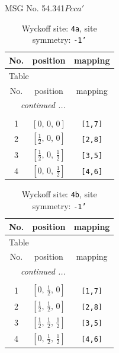 \documentclass[fleqn,8pt]{jsarticle}
\begin{document}
\setcounter{MaxMatrixCols}{32}

\renewcommand{\tablename}{Table~}
\renewcommand{\figurename}{Figure~}
\begin{center}
\LARGE
MSG No. 54.341\quad$Pcca'$
\end{center}
\renewcommand{\arraystretch}{1.2}
\begin{longtable}{ccc}
\caption{Wyckoff site: {\tt 4a}, site symmetry: {\tt -1'}}
 \\
 \hline \hline
No. & position & mapping \\ \hline \endfirsthead

\multicolumn{2}{l}{\tablename\ \thetable{}} \\
 \hline \hline
No. & position & mapping \\ \hline \endhead

 \hline \hline
\multicolumn{2}{r}{\footnotesize\it continued ...} \\ \endfoot

 \hline \hline
\multicolumn{2}{r}{} \\ \endlastfoot

1 & $\left[ 0,\, 0,\, 0 \right]$ & {\tt [1,7]} \\ \hline
2 & $\left[ \frac{1}{2},\, 0,\, 0 \right]$ & {\tt [2,8]} \\ \hline
3 & $\left[ \frac{1}{2},\, 0,\, \frac{1}{2} \right]$ & {\tt [3,5]} \\ \hline
4 & $\left[ 0,\, 0,\, \frac{1}{2} \right]$ & {\tt [4,6]} \\
\end{longtable}
\renewcommand{\arraystretch}{1.2}
\begin{longtable}{ccc}
\caption{Wyckoff site: {\tt 4b}, site symmetry: {\tt -1'}}
 \\
 \hline \hline
No. & position & mapping \\ \hline \endfirsthead

\multicolumn{2}{l}{\tablename\ \thetable{}} \\
 \hline \hline
No. & position & mapping \\ \hline \endhead

 \hline \hline
\multicolumn{2}{r}{\footnotesize\it continued ...} \\ \endfoot

 \hline \hline
\multicolumn{2}{r}{} \\ \endlastfoot

1 & $\left[ 0,\, \frac{1}{2},\, 0 \right]$ & {\tt [1,7]} \\ \hline
2 & $\left[ \frac{1}{2},\, \frac{1}{2},\, 0 \right]$ & {\tt [2,8]} \\ \hline
3 & $\left[ \frac{1}{2},\, \frac{1}{2},\, \frac{1}{2} \right]$ & {\tt [3,5]} \\ \hline
4 & $\left[ 0,\, \frac{1}{2},\, \frac{1}{2} \right]$ & {\tt [4,6]} \\
\end{longtable}
\end{document}
